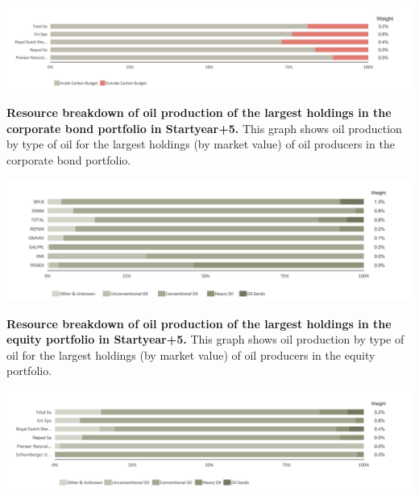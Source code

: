 \documentclass[10pt,table]{article}\usepackage[]{graphicx}\usepackage[]{color}
\begin{document}
	\vspace{-.35cm}

	\begin{center}
		\includegraphics[trim = {0 0cm 0 0},width=1\linewidth]{ReportOutputs/Fig48}
	\end{center}


	\textbf{Resource breakdown of oil production of the largest holdings in the corporate bond portfolio in Startyear+5.}
	This graph shows oil production by type of oil for the largest holdings (by market value) of oil producers in the corporate bond portfolio. 

	\vspace{-.35cm}

	\begin{center}
		\includegraphics[trim = {0 0cm 0 0},width=1\linewidth]{ReportOutputs/Fig43}
	\end{center}

	\textbf{Resource breakdown of oil production of the largest holdings in the equity portfolio in Startyear+5.}
	This graph shows oil production by type of oil for the largest holdings (by market value) of oil producers in the equity portfolio. 

	\vspace{-.35cm}

	\begin{center}
		\includegraphics[trim = {0 0cm 0 0},width=1\linewidth]{ReportOutputs/Fig47}
	\end{center}
\end{document}
